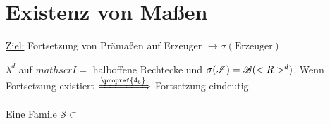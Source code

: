 \section{Existenz von Maßen}

\underline{Ziel:} Fortsetzung von Prämaßen auf Erzeuger $\rightarrow \sigma(\text{Erzeuger})$
\begin{*example}
	$\lambda^d$ auf $mathscr{I}=$ halboffene Rechtecke und $\sigma(\mathscr{I}) = \mathscr{B}(<R>^d)$. Wenn Fortsetzung existiert $\xRightarrow{\propref{4_6}}$ Fortsetzung eindeutig. 
\end{*example}

\begin{definition}
	Eine Famile $\mathscr{S} \subset $
\end{definition}